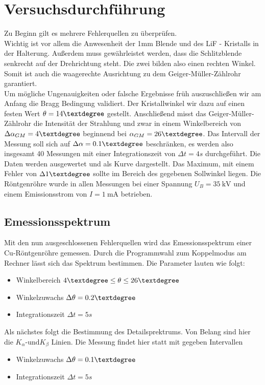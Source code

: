 \section{Versuchsdurchführung}
Zu Beginn gilt es mehrere Fehlerquellen zu überprüfen. \\
Wichtig ist vor allem die Anwesenheit der 1mm Blende und des LiF - Kristalls in der Halterung.
Außerdem muss gewährleistet werden, dass die Schlitzblende senkrecht auf der Drehrichtung steht. Die zwei bilden also einen rechten Winkel.
Somit ist auch die waagerechte Ausrichtung zu dem Geiger-Müller-Zählrohr garantiert. %
\\
\newline
Um mögliche Ungenauigkeiten oder falsche Ergebnisse früh auszuschließen wir am Anfang die Bragg Bedingung %
validiert. Der Kristallwinkel wir dazu auf einen festen Wert $\theta = 14 \textdegree $  gestellt.
Anschließend misst das Geiger-Müller-Zählrohr die Intensität der Strahlung und zwar in einem Winkelbereich von 
$\Delta \alpha_{GM} = 4 \textdegree$ beginnend bei $\alpha_{GM} = 26 \textdegree$. Das Intervall der Messung soll sich 
auf $\Delta \alpha = 0.1 \textdegree$ beschränken, es werden also insgesamt 40 Messungen mit einer Integrationszeit von $\Delta t = 4 \si{s}$ durchgeführt. 
Die Daten werden ausgewertet und als Kurve dargestellt. Das Maximum, mit einem Fehler von $\Delta 1\textdegree$ sollte im Bereich des gegebenen Sollwinkel liegen.
Die Röntgenröhre wurde in allen Messungen bei einer Spannung $U_{B} = \SI{35}{\kilo\volt}$ und einem Emissionsstrom von $I = \SI{1}{\milli\ampere}$ betrieben.
\\
\newline
\subsection{Emessionsspektrum}
Mit den nun ausgeschlossenen Fehlerquellen wird das Emessionsspektrum einer Cu-Röntgenröhre gemessen.
Durch die Programmwahl zum Koppelmodus am Rechner lässt sich das Spektrum bestimmen.
Die Parameter lauten wie folgt:
\begin{itemize}
    \item{Winkelbereich   $4 \textdegree \leq \theta \leq 26 \textdegree $}
    \item{Winkelzuwachs $\Delta \theta = 0.2 \textdegree$}
    \item{Integrationszeit $\Delta t = 5 \si{s}$}
\end{itemize}
Als nächstes folgt die Bestimmung des Detailsprektrums. Von Belang sind hier die $K_{\alpha} \text{-und} K_{\beta}$ Linien. 
Die Messung findet hier statt mit gegeben Intervallen
\begin{itemize}
    \item{Winkelzuwachs $\Delta \theta = 0.1 \textdegree$}
    \item{Integrationszeit $\Delta t = 5 \si{s}$}
\end{itemize}

